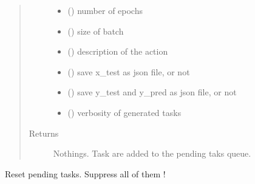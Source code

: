 \documentclass[letterpaper,10pt,english]{sphinxmanual}
\begin{document}
\begin{fulllineitems}
\begin{quote}
\begin{description}
\begin{itemize}
\item {} 
\sphinxAtStartPar
{} () \textendash{} number of epochs

\item {} 
\sphinxAtStartPar
{} () \textendash{} size of batch

\item {} 
\sphinxAtStartPar
{} () \textendash{} description of the action

\item {} 
\sphinxAtStartPar
{} () \textendash{} save x\_test as json file, or not

\item {} 
\sphinxAtStartPar
{} () \textendash{} save y\_test and y\_pred  as json file, or not

\item {} 
\sphinxAtStartPar
{} () \textendash{} verbosity of generated tasks

\end{itemize}

\item[{Returns}] \leavevmode
\sphinxAtStartPar
Nothings. Task are added to the pending taks queue.

\end{description}\end{quote}

\end{fulllineitems}


\begin{fulllineitems}
\label{\detokenize{PyTerK:pyterk.task_manager.reset}}
\sphinxAtStartPar
Reset pending tasks. Suppress all of them !

\end{fulllineitems}
\end{document}
